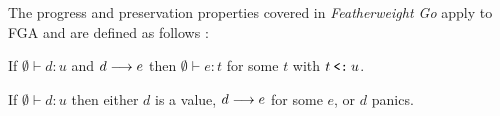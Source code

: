 The progress and preservation properties covered in \emph{Featherweight Go}
apply to FGA and are defined as follows \autocite{fg}:

\begin{theorem}[Preservation]
    If\/ $\emptyset \vdash d : u$ and $d \longrightarrow e$
    then\/ $\emptyset \vdash e : t$ for some $t$
    with\/ $t \mathbin{\texttt{<:}} u$.
\end{theorem}

\begin{theorem}[Progress]
    If\/ $\emptyset \vdash d:u$ then
    either\/ $d$ is a value,
    $d \longrightarrow e$ for some $e$,
    or\/ $d$ panics.
\end{theorem}

